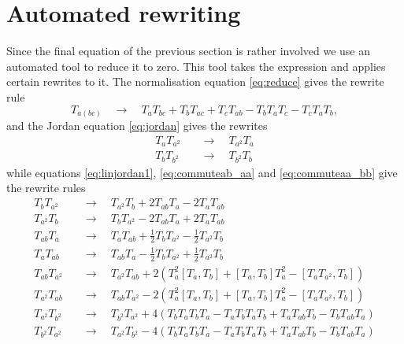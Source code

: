 \documentclass{article}
\begin{document}
\section{Automated rewriting}
Since the final equation of the previous section is rather involved we use an automated tool to reduce it to zero. This tool takes the expression and applies certain rewrites to it. The normalisation equation \eqref{eq:reduce} gives the rewrite rule
\begin{equation}\label{rewrite:normalise}
    T_{a(bc)} \quad \rightarrow\quad T_aT_{bc} + T_bT_{ac} + T_cT_{ab} - T_bT_aT_c - T_cT_aT_b,
\end{equation}
and the Jordan equation \eqref{eq:jordan} gives the rewrites
\begin{equation}\label{rewrite:jordan}
\begin{aligned}
    T_aT_{a^2} &\quad \rightarrow \quad T_{a^2}T_a \\
    T_bT_{b^2} &\quad \rightarrow \quad T_{b^2}T_b 
\end{aligned}
\end{equation}
while equations \eqref{eq:linjordan1}, \eqref{eq:commuteab_aa} and \eqref{eq:commuteaa_bb} give the rewrite rules
\begin{equation}\label{rewrite:all}
\begin{aligned}
    T_bT_{a^2} &\quad\rightarrow\quad T_{a^2}T_b + 2T_{ab}T_a - 2T_aT_{ab} \\
        T_{a^2}T_b &\quad\rightarrow\quad T_bT_{a^2} - 2T_{ab}T_a + 2T_aT_{ab} \\
        T_{ab}T_a &\quad\rightarrow\quad T_aT_{ab} + \frac{1}{2}T_bT_{a^2} - \frac{1}{2}T_{a^2}T_b \\
        T_aT_{ab} &\quad\rightarrow\quad T_{ab}T_a - \frac{1}{2}T_bT_{a^2} + \frac{1}{2}T_{a^2}T_b \\
        T_{ab}T_{a^2} &\quad\rightarrow\quad T_{a^2}T_{ab} + 2(T_a^2[T_a,T_b] + [T_a,T_b]T_a^2 -[T_aT_{a^2}, T_b]) \\
        T_{a^2}T_{ab} &\quad\rightarrow\quad T_{ab}T_{a^2} - 2(T_a^2[T_a,T_b] + [T_a,T_b]T_a^2 -[T_aT_{a^2}, T_b]) \\
        T_{a^2}T_{b^2} &\quad\rightarrow\quad T_{b^2}T_{a^2} + 4 (T_bT_aT_bT_a - T_aT_bT_aT_b + T_aT_{ab}T_b - T_bT_{ab}T_a) \\
        T_{b^2}T_{a^2} &\quad\rightarrow\quad T_{a^2}T_{b^2} - 4 (T_bT_aT_bT_a - T_aT_bT_aT_b + T_aT_{ab}T_b - T_bT_{ab}T_a) \\
\end{aligned}
\end{equation}
\end{document}
